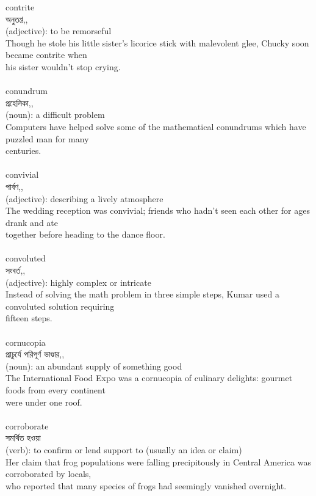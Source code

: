 \documentclass{article}
\begin{document}
{contrite}\\
{অনুতপ্ত,,}\\
{(adjective): to be remorseful\\Though he stole his little sister's licorice stick with malevolent glee, Chucky soon became contrite when\\his sister wouldn't stop crying.\\}\\
{conundrum}\\
{প্রহেলিকা,,}\\
{(noun): a difficult problem\\Computers have helped solve some of the mathematical conundrums which have puzzled man for many\\centuries.\\}\\
{convivial}\\
{পার্বণ,,}\\
{(adjective): describing a lively atmosphere\\The wedding reception was convivial; friends who hadn't seen each other for ages drank and ate\\together before heading to the dance floor.\\}\\
{convoluted}\\
{সংবর্ত,,}\\
{(adjective): highly complex or intricate\\Instead of solving the math problem in three simple steps, Kumar used a convoluted solution requiring\\fifteen steps.\\}\\
{cornucopia}\\
{প্রাচুর্যে পরিপূর্ণ ভাণ্ডার,,}\\
{(noun): an abundant supply of something good\\The International Food Expo was a cornucopia of culinary delights: gourmet foods from every continent\\were under one roof.\\}\\
{corroborate}\\
{সমর্থিত হওয়া}\\
{(verb): to confirm or lend support to (usually an idea or claim)\\Her claim that frog populations were falling precipitously in Central America was corroborated by locals,\\who reported that many species of frogs had seemingly vanished overnight.\\}\\
\end{document}
